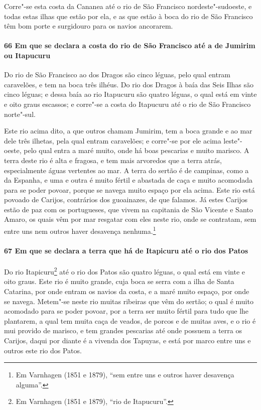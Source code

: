 Corre"-se esta costa da Cananea até o rio de São Francisco nordeste"-sudoeste, e todas estas
ilhas que estão por ela, e as que estão à boca do rio de São Francisco têm bom porte e
surgidouro para os navios ancorarem.

\paragraph{66 Em que se declara a costa do rio de São Francisco até a de Jumirim ou
Itapucuru}

Do rio de São Francisco ao dos Dragos são cinco léguas, pelo qual entram caravelões, e tem
na boca três ilhéus. Do rio dos Dragos à baía das Seis Ilhas são cinco léguas; e dessa
baía ao rio Itapucuru são quatro léguas, o qual está em vinte e oito graus escassos; e
corre"-se a costa do Itapucuru até o rio de São Francisco norte"-sul.

Este rio acima dito, a que outros chamam Jumirim, tem a boca grande e ao mar dele três
ilhetas, pela qual entram caravelões; e corre"-se por ele acima leste"-oeste, pelo qual
entra a maré muito, onde há boas pescarias e muito marisco. A terra deste rio é alta e
fragosa, e tem mais arvoredos que a terra atrás, especialmente águas vertentes ao mar. A
terra do sertão é de campinas, como a da Espanha, e uma e outra é muito fértil e abastada
de caça e muito acomodada para se poder povoar, porque se navega muito espaço por ela
acima. Este rio está povoado de Carijos, contrários dos guoainazes, de que falamos. Já
estes Carijos estão de paz com os portugueses, que vivem na capitania de São Vicente e
Santo Amaro, os quais vêm por mar resgatar com eles neste rio, onde se contratam, sem
entre uns nem outros haver desavença nenhuma.\footnote{ Em Varnhagen (1851 e 1879), ``sem
entre uns e outros haver desavença alguma''.}

\paragraph{67 Em que se declara a terra que há de Itapicuru até o rio dos Patos}

Do rio Itapicuru\footnote{ Em Varnhagen (1851 e 1879), ``rio de Itapucuru''.} até o rio
dos Patos são quatro léguas, o qual está em vinte e oito graus. Este rio é muito grande,
cuja boca se serra com a ilha de Santa Catarina, por onde entram os navios da costa, e a
maré muito espaço, por onde se navega. Metem"-se neste rio muitas ribeiras que vêm do
sertão; o qual é muito acomodado para se poder povoar, por a terra ser muito fértil para
tudo que lhe plantarem, a qual tem muita caça de veados, de porcos e de muitas aves, e o
rio é mui provido de marisco, e tem grandes pescarias até onde possuem a terra os Carijos,
daqui por diante é a vivenda dos Tapuyas, e está por marco entre uns e outros este rio dos
Patos.

